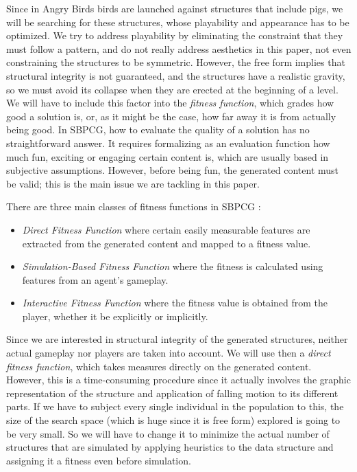 \documentclass[sigconf]{acmart}
\begin{document}
Since in Angry Birds birds are
launched against structures that include pigs, we will be searching
for these structures, whose playability and appearance has to be
optimized. We try to address playability by eliminating the constraint
that they must follow a pattern, and do not really address aesthetics
in this paper, not even constraining the structures to be
symmetric. However, the free form implies that structural integrity is
not guaranteed, and the structures have a realistic
gravity, so we must avoid its collapse when they are erected at the
beginning of a level. We will have to include this factor into the 
\textit{fitness function}, which grades how good a solution is, or, as
it might be the case, how far away it is from actually being good.
In SBPCG, how to evaluate the quality of a solution has no straightforward 
answer. It requires formalizing as an evaluation function how much fun, 
exciting or engaging certain content is, which are usually based in subjective 
assumptions. However, before being fun, the generated content must be
valid; this is the main issue we are tackling in this paper.

There are three main classes of fitness functions in 
SBPCG \cite{togelius2010search}:

\begin{itemize}
	\item \textit{Direct Fitness Function} where certain easily measurable 
	features are extracted from the generated content and mapped to a 
	fitness value.
	\item \textit{Simulation-Based Fitness Function} where the 
	fitness is calculated using features from an agent's gameplay. 
	\item \textit{Interactive Fitness Function} where the fitness value is 
	obtained from the player, whether it be explicitly or 
	implicitly. 
\end{itemize}

Since we are interested in structural integrity of the generated
structures, neither actual gameplay nor players are taken into
account. We will use then a {\em direct fitness function}, which takes
measures directly on the generated content. However, this is a
time-consuming procedure since it actually involves the graphic
representation of the structure and application of falling motion to
its different parts. If we have to subject every single individual in
the population to this, the size of the search space (which is huge
since it is free form) explored is going to be very small. So we will
have to change it to minimize the actual number of structures that are
simulated by applying heuristics to the data structure and assigning
it a fitness even before simulation.
\end{document}
